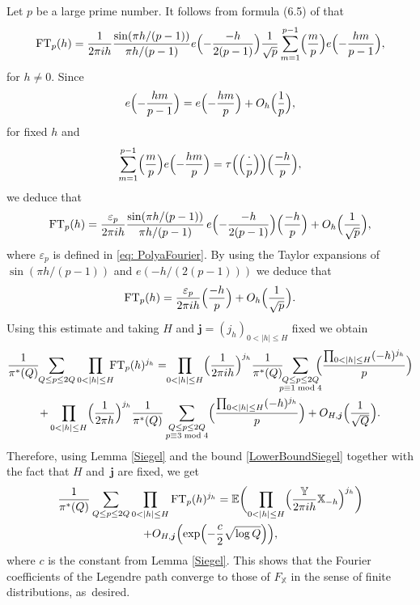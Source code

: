 \documentclass[10pt]{amsart}
\theoremstyle{plain}
\theoremstyle{definition}
\newcommand{\Legendre}[2]{\Bigl(\dfrac{#1}{#2}\Bigr)}
\let\ep\varepsilon
\newcommand{\X}{\mathbb{X}}
\newcommand{\Y}{\mathbb{Y}}
\newcommand{\ex}{\mathbb{E}}
\begin{document}
Let $p$ be a large prime number. It follows from formula (6.5) of \cite[Chap.\,6]{Ko} that
\[
\textup{FT}_p(h)=\frac{1}{2\pi i h}\frac{\sin(\pi h/(p-1))}{\pi h/(p-1)} e\Bigl(-\frac{-h}{2(p-1)}\Bigr) \frac{1}{\sqrt{p}} \sum_{m=1}^{p-1} \Legendre{m}{p} e\Bigl(-\frac{hm}{p-1}\Bigr), \]
for $h\neq 0$. Since
\[
e\Bigl(-\frac{hm}{p-1}\Bigr)= e\Bigl(-\frac{hm}{p}\Bigr) +O_h\Bigl(\frac{1}{p}\Bigr),\]
for fixed $h$ and
\[
\sum_{m=1}^{p-1} \Legendre{m}{p} e\Bigl(-\frac{hm}{p}\Bigr)= \tau\Bigl(\Legendre{\cdot}{p}\Bigr) \Legendre{-h}{p},\]
we deduce that
\[
\textup{FT}_p(h)= \frac{\varepsilon_p}{2\pi i h} \frac{\sin(\pi h/(p-1))}{\pi h/(p-1)}\, e\Bigl(-\frac{-h}{2(p-1)}\Bigr) \Legendre{-h}{p} +O_h\Bigl(\frac{1}{\sqrt{p}}\Bigr), \]
where $\ep_p$ is defined in \eqref{eq: PolyaFourier}. By using the Taylor expansions of $\sin(\pi h/(p-1))$ and $e(-h/(2(p-1)))$ we deduce that
\[\textup{FT}_p(h)= \frac{\ep_p}{2\pi i h}\Legendre{-h}{p} +O_h\Bigl(\frac{1}{\sqrt{p}}\Bigr). \]
Using this estimate and taking $H$ and $\boldsymbol{j}=(j_h)_{0<|h|\leq H}$ fixed we obtain
\begin{multline*}
\frac{1}{\pi^*(Q)}\hspace*{-1mm}\sum_{Q\leq p\leq 2Q} \prod_{0<|h|\leq H}\hspace*{-2mm}\textup{FT}_p (h)^{j_h}=\hspace*{-1mm} \prod_{0<|h|\leq H}\Bigl(\frac{1}{2\pi i h}\Bigr)^{j_h}\frac{1}{\pi^*(Q)}\hspace*{-2mm}\sum_{\substack{Q\leq p\leq 2Q\\ p\equiv 1 \bmod 4}}\hspace*{-2mm} \Legendre{\prod_{0<|h|\leq H} (-h)^{j_h}}{p}\\
+\prod_{0<|h|\leq H}\Bigl(\frac{1}{2\pi h}\Bigr)^{j_h}\frac{1}{\pi^*(Q)}\sum_{\substack{Q\leq p\leq 2Q\\ p\equiv 3 \bmod 4}} \Legendre{\prod_{0<|h|\leq H} (-h)^{j_h}}{p} +O_{H, \boldsymbol{j}}\Bigl(\frac{1}{\sqrt{Q}}\Bigr).
\end{multline*}
Therefore, using Lemma \ref{Siegel} and the bound \eqref{LowerBoundSiegel} together with the fact that $H$ and~$\boldsymbol{j}$ are fixed, we get
\begin{multline*}
\frac{1}{\pi^*(Q)}\sum_{Q\leq p\leq 2Q} \prod_{0<|h|\leq H}\textup{FT}_p (h)^{j_h}= \ex\biggl(\prod_{0<|h|\leq H}\Bigl(\frac{\Y}{2\pi i h} \X_{-h} \Bigr)^{j_h}\biggr) \\
+O_{H, \boldsymbol{j}}\Bigl(\exp\Bigl(-\frac c2 \sqrt{\log Q}\Bigr)\Bigr),
\end{multline*}
where $c$ is the constant from Lemma \ref{Siegel}. This shows that the Fourier coefficients of the Legendre path converge to those of $F_{\mathbb{X}}$ in the sense of finite distributions, as~desired.
\end{document}
